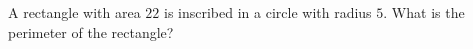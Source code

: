 A rectangle with area $22$ is inscribed in a circle with radius $5$. What is the perimeter of the rectangle?
